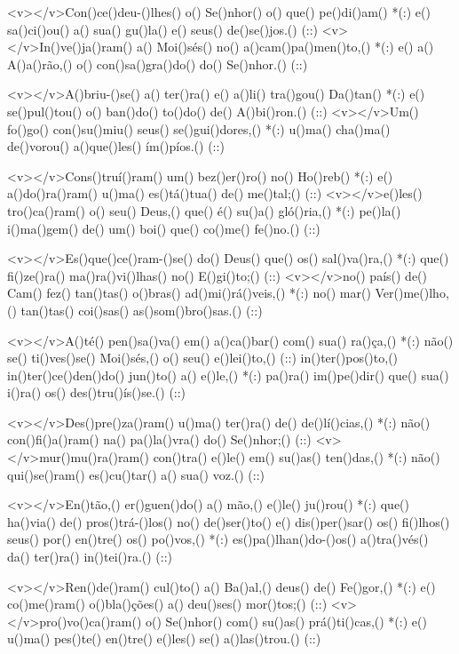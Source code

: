 <v></v>Con()ce()deu-()lhes() o() Se()nhor() o() que() pe()di()am() *(:)
e() sa()ci()ou() a() sua() gu()la() e() seus() de()se()jos.() (::)
<v></v>In()ve()ja()ram() a() Moi()sés() no() a()cam()pa()men()to,() *(:)
e() a() A()a()rão,() o() con()sa()gra()do() do() Se()nhor.() (::)

<v></v>A()briu-()se() a() ter()ra() e() a()li() tra()gou() Da()tan() *(:)
e() se()pul()tou() o() ban()do() to()do() de() A()bi()ron.() (::)
<v></v>Um() fo()go() con()su()miu() seus() se()gui()dores,() *(:)
u()ma() cha()ma() de()vorou() a()que()les() ím()píos.() (::)

<v></v>Cons()truí()ram() um() bez()er()ro() no() Ho()reb() *(:)
e() a()do()ra()ram() u()ma() es()tá()tua() de() me()tal;() (::)
<v></v>e()les() tro()ca()ram() o() seu() Deus,() que() é() su()a() gló()ria,() *(:)
pe()la() i()ma()gem() de() um() boi() que() co()me() fe()no.() (::)

<v></v>Es()que()ce()ram-()se() do() Deus() que() os() sal()va()ra,() *(:)
que() fi()ze()ra() ma()ra()vi()lhas() no() E()gi()to;() (::)
<v></v>no() país() de() Cam() fez() tan()tas() o()bras() ad()mi()rá()veis,() *(:)
no() mar() Ver()me()lho,() tan()tas() coi()sas() as()som()bro()sas.() (::)

<v></v>A()té() pen()sa()va() em() a()ca()bar() com() sua() ra()ça,() *(:)
não() se() ti()ves()se() Moi()sés,() o() seu() e()lei()to,() (::)
in()ter()pos()to,() in()ter()ce()den()do() jun()to() a() e()le,() *(:)
pa()ra() im()pe()dir() que() sua() i()ra() os() des()tru()ís()se.() (::)

<v></v>Des()pre()za()ram() u()ma() ter()ra() de() de()lí()cias,() *(:)
não() con()fi()a()ram() na() pa()la()vra() do() Se()nhor;() (::)
<v></v>mur()mu()ra()ram() con()tra() e()le() em() su()as() ten()das,() *(:)
não() qui()se()ram() es()cu()tar() a() sua() voz.() (::)

<v></v>En()tão,() er()guen()do() a() mão,() e()le() ju()rou() *(:)
que() ha()via() de() pros()trá-()los() no() de()ser()to()
e() dis()per()sar() os() fi()lhos() seus() por() en()tre() os() po()vos,() *(:)
es()pa()lhan()do-()os() a()tra()vés() da() ter()ra() in()tei()ra.() (::)

<v></v>Ren()de()ram() cul()to() a() Ba()al,() deus() de() Fe()gor,() *(:)
e() co()me()ram() o()bla()ções() a() deu()ses() mor()tos;() (::)
<v></v>pro()vo()ca()ram() o() Se()nhor() com() su()as() prá()ti()cas,() *(:)
e() u()ma() pes()te() en()tre() e()les() se() a()las()trou.() (::)


